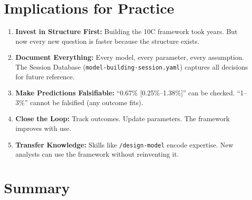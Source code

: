 \section{Implications for Practice}
\label{sec:fm-practice}

\begin{tcolorbox}[colback=green!5!white, colframe=green!75!black,
    title=Practical Implications]
\begin{enumerate}
\item \textbf{Invest in Structure First:} Building the 10C framework took years. But now every new question is faster because the structure exists.

\item \textbf{Document Everything:} Every model, every parameter, every assumption. The Session Database (\texttt{model-building-session.yaml}) captures all decisions for future reference.

\item \textbf{Make Predictions Falsifiable:} ``0.67\% [0.25\%--1.38\%]'' can be checked. ``1--3\%'' cannot be falsified (any outcome fits).

\item \textbf{Close the Loop:} Track outcomes. Update parameters. The framework improves with use.

\item \textbf{Transfer Knowledge:} Skills like \texttt{/design-model} encode expertise. New analysts can use the framework without reinventing it.
\end{enumerate}
\end{tcolorbox}


\section{Summary}
\label{sec:fm-summary}

